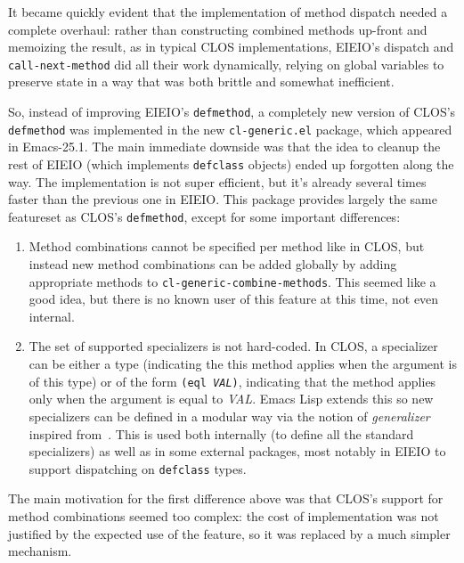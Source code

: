 \documentclass[format=acmsmall, review]{acmart}
\newcommand \Elisp {Emacs Lisp}
\newcommand \id[1] {\textrm{\textsl{#1}}}
\begin{document}
It became quickly evident that the implementation of method dispatch
needed a complete overhaul: rather than constructing combined methods
up-front and memoizing the result, as in typical CLOS implementations,
EIEIO's dispatch and \texttt{call-next-method} did all their work
dynamically, relying on global variables to preserve state in
a way that was both brittle and somewhat inefficient.

So, instead of improving EIEIO's \texttt{defmethod}, a completely new
version of CLOS's \texttt{defmethod} was implemented in the new
\texttt{cl-generic.el} package, which appeared in Emacs-25.1.  The main
immediate downside was that the idea to cleanup the rest of EIEIO (which
implements \texttt{defclass} objects) ended up forgotten along the way.
The implementation is not super efficient, but it's already several times
faster than the previous one in EIEIO.  This package provides largely the
same featureset as CLOS's \texttt{defmethod}, except for some important
differences:
\begin{enumerate}
\item Method combinations cannot be specified per method like in CLOS, but
  instead new method combinations can be added globally by adding
  appropriate methods to
  \texttt{cl-\linebreak[0]generic-\linebreak[0]combine-\linebreak[0]methods}.
  This seemed like a good idea, but there is no known user of this feature
  at this time, not even internal.
\item The set of supported specializers is not hard-coded.  In CLOS,
  a specializer can be either a type (indicating the this method applies when the argument is of
  this type) or of the form \texttt{(eql \id{VAL})}, indicating that the
  method applies only when the argument is equal to \id{VAL}.
  \Elisp{} extends this so new specializers
  can be defined in a modular way via the notion of \emph{generalizer}
  inspired from~\citet{Rhodes14}.  This is used both internally (to define
  all the standard specializers) as well as in some external packages, most
  notably in EIEIO to support dispatching on \texttt{defclass} types.
\end{enumerate}
The main motivation for the first difference above was that CLOS's support
for method combinations seemed too complex: the cost of implementation was
not justified by the expected use of the feature, so it was replaced by
a much simpler mechanism.
\end{document}
